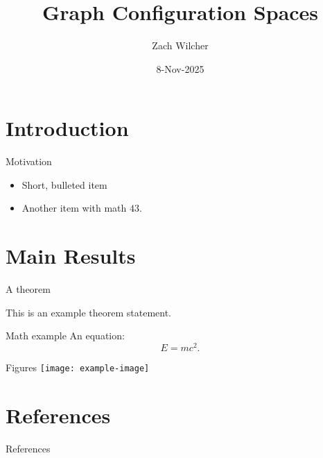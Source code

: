 \documentclass{beamer}
\title{Graph Configuration Spaces}
\author{Zach Wilcher}
\institute{Ball State University}
\date{8-Nov-2025}
\begin{document}




\section{Introduction}
\begin{frame}{Motivation}
  \begin{itemize}
    \item Short, bulleted item
    \item Another item with math \(43\).
  \end{itemize}
\end{frame}

\section{Main Results}
\begin{frame}{A theorem}
  \begin{theorem}
    This is an example theorem statement.
  \end{theorem}
\end{frame}

\begin{frame}{Math example}
  An equation:
  \[ E = mc^2. \]
\end{frame}

\begin{frame}{Figures}
  \centering
  \texttt{[image: example-image]}
\end{frame}

\section{References}
\begin{frame}[allowframebreaks]{References}
  \printbibliography
\end{frame}
\end{document}
